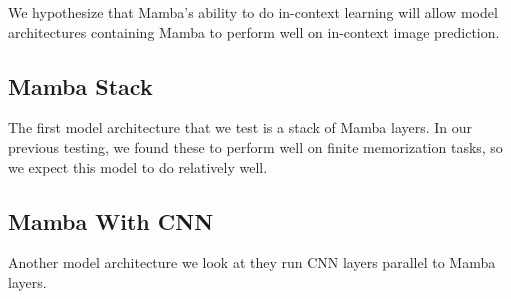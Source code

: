 We hypothesize that Mamba's ability to do in-context learning\cite{mamba} will
allow model architectures containing Mamba to perform well on in-context
image prediction.

\subsection{Mamba Stack}
The first model architecture that we test is a stack of Mamba layers. In our
previous testing, we found these to perform well on finite memorization tasks,
so we expect this model to do relatively well.

\subsection{Mamba With CNN}
Another model architecture we look at  they run CNN layers
parallel to Mamba layers.
\subsection{}
